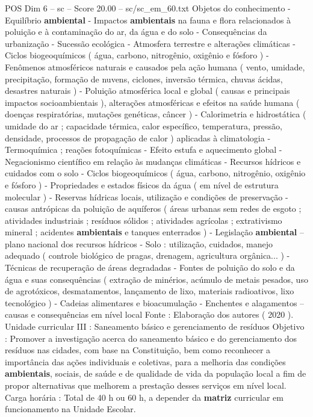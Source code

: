 \begin{textsample}{POS Dim 6 – sc – Score 20.00 – sc/sc\_em\_60.txt}
Objetos do conhecimento - Equilíbrio \textbf{ambiental} - Impactos \textbf{ambientais} na fauna e flora relacionados à poluição e à contaminação do ar, da água e do solo - Consequências da urbanização - Sucessão ecológica - Atmosfera terrestre e alterações climáticas - Ciclos biogeoquímicos ( água, carbono, nitrogênio, oxigênio e fósforo ) - Fenômenos atmosféricos naturais e causados pela ação humana ( vento, umidade, precipitação, formação de nuvens, ciclones, inversão térmica, chuvas ácidas, desastres naturais ) - Poluição atmosférica local e global ( causas e principais impactos socioambientais ), alterações atmosféricas e efeitos na saúde humana ( doenças respiratórias, mutações genéticas, câncer ) - Calorimetria e hidrostática ( umidade do ar ; capacidade térmica, calor específico, temperatura, pressão, densidade, processos de propagação de calor ) aplicadas à climatologia - Termoquímica ; reações fotoquímicas - Efeito estufa e aquecimento global - Negacionismo científico em relação às mudanças climáticas - Recursos hídricos e cuidados com o solo - Ciclos biogeoquímicos ( água, carbono, nitrogênio, oxigênio e fósforo ) - Propriedades e estados físicos da água ( em nível de estrutura molecular ) - Reservas hídricas locais, utilização e condições de preservação - causas antrópicas da poluição de aquíferos ( áreas urbanas sem redes de esgoto ; atividades industriais ; resíduos sólidos ; atividades agrícolas ; extrativismo mineral ; acidentes \textbf{ambientais} e tanques enterrados ) - Legislação \textbf{ambiental} – plano nacional dos recursos hídricos - Solo : utilização, cuidados, manejo adequado ( controle biológico de pragas, drenagem, agricultura orgânica... ) - Técnicas de recuperação de áreas degradadas - Fontes de poluição do solo e da água e suas consequências ( extração de minérios, acúmulo de metais pesados, uso de agrotóxicos, desmatamentos, lançamento de lixo, materiais radioativos, lixo tecnológico ) - Cadeias alimentares e bioacumulação - Enchentes e alagamentos – causas e consequências em nível local Fonte : Elaboração dos autores ( 2020 ).
Unidade curricular III : Saneamento básico e gerenciamento de resíduos Objetivo : Promover a investigação acerca do saneamento básico e do gerenciamento dos resíduos nas cidades, com base na Constituição, bem como reconhecer a importância das ações individuais e coletivas, para a melhoria das condições \textbf{ambientais}, sociais, de saúde e de qualidade de vida da população local a fim de propor alternativas que melhorem a prestação desses serviços em nível local.
Carga horária : Total de 40 h ou 60 h, a depender da \textbf{matriz} curricular em funcionamento na Unidade Escolar.

\end{textsample}
